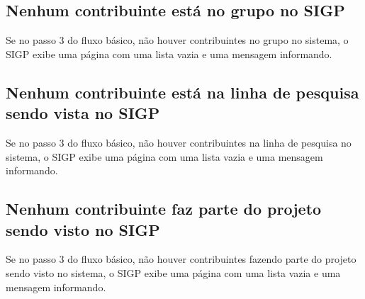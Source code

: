 \documentclass[11pt, a4paper,oneside]{book}
\begin{document}
\subsection{Nenhum contribuinte está no grupo no SIGP}
Se no passo $3$ do fluxo básico, não houver contribuintes no grupo no sistema, o SIGP exibe uma página com uma lista vazia e uma mensagem informando.

\subsection{Nenhum contribuinte está na linha de pesquisa sendo vista no SIGP}
Se no passo $3$ do fluxo básico, não houver contribuintes na linha de pesquisa no sistema, o SIGP exibe uma página com uma lista vazia e uma mensagem informando.

\subsection{Nenhum contribuinte faz parte do projeto sendo visto no SIGP}
Se no passo $3$ do fluxo básico, não houver contribuintes fazendo parte do projeto sendo visto no sistema, o SIGP exibe uma página com uma lista vazia e uma mensagem informando.

%
%
%
%
\end{document}

